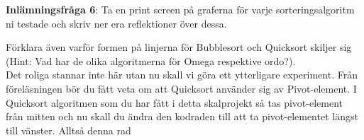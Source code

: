 \documentclass{article}
\begin{document}

\textbf{Inlämningsfråga 6}: Ta en print screen på graferna för varje sorteringsalgoritm ni testade  och skriv ner era reflektioner över dessa. 

Förklara även varför formen på linjerna för Bubblesort och Quicksort skiljer sig (Hint: Vad har de olika algoritmerna för Omega respektive ordo?). \\

Det roliga stannar inte här utan nu skall vi göra ett ytterligare experiment. Från föreläsningen bör du fått veta om att Quicksort använder sig av Pivot-element. I Quicksort algoritmen som du har fått i detta skalprojekt så tas pivot-element från mitten och nu skall du ändra den kodraden till att ta pivot-elementet längst till vänster. Alltså denna rad\\
\end{document}
